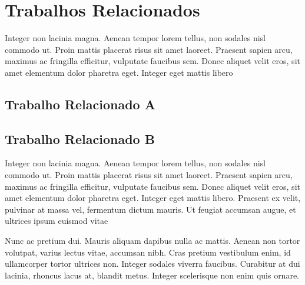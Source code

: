 \chapter{Trabalhos Relacionados}
\label{cap:trabalhos-relacionados}

Integer non lacinia magna. Aenean tempor lorem tellus, non sodales nisl commodo ut. Proin mattis placerat risus sit amet laoreet. Praesent sapien arcu, maximus ac fringilla efficitur, vulputate faucibus sem. Donec aliquet velit eros, sit amet elementum dolor pharetra eget. Integer eget mattis libero

\section{Trabalho Relacionado A}
\label{sec:trabalho-relacionado-a}

\lipsum[10]

	
\lipsum[11]

\section{Trabalho Relacionado B}
\label{sec:trabalho-relacionado-b}

Integer non lacinia magna. Aenean tempor lorem tellus, non sodales nisl commodo ut. Proin mattis placerat risus sit amet laoreet. Praesent sapien arcu, maximus ac fringilla efficitur, vulputate faucibus sem. Donec aliquet velit eros, sit amet elementum dolor pharetra eget. Integer eget mattis libero. Praesent ex velit, pulvinar at massa vel, fermentum dictum mauris. Ut feugiat accumsan augue, et ultrices ipsum euismod vitae

	
Nunc ac pretium dui. Mauris aliquam dapibus nulla ac mattis. Aenean non tortor volutpat, varius lectus vitae, accumsan nibh. Cras pretium vestibulum enim, id ullamcorper tortor ultrices non. Integer sodales viverra faucibus. Curabitur at dui lacinia, rhoncus lacus at, blandit metus. Integer scelerisque non enim quis ornare.

	\begin{quadro}[h!]	
		\centering
	\end{quadro}
	
